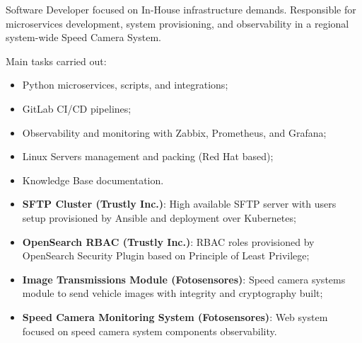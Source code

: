 \documentclass[10pt,a4paper]{altacv}
\begin{document}
\divider


Software Developer focused on In-House infrastructure demands. Responsible for microservices development, system provisioning, and observability in a regional system-wide Speed Camera System.

\bigskip

Main tasks carried out:

\bigskip

\begin{itemize}
    \item Python microservices, scripts, and integrations;
    \item GitLab CI/CD pipelines;
    \item Observability and monitoring with Zabbix, Prometheus, and Grafana;
    \item Linux Servers management and packing (Red Hat based);
    \item Knowledge Base documentation.
\end{itemize}


\begin{itemize}
    \item \textbf{SFTP Cluster (Trustly Inc.)}: High available SFTP server with users setup provisioned by Ansible and deployment over Kubernetes;
    \item \textbf{OpenSearch RBAC (Trustly Inc.)}: RBAC roles provisioned by OpenSearch Security Plugin based on Principle of Least Privilege;
    \item \textbf{Image Transmissions Module (Fotosensores)}: Speed camera systems module to send vehicle images with integrity and cryptography built;
    \item \textbf{Speed Camera Monitoring System (Fotosensores)}: Web system focused on speed camera system components observability.
\end{itemize}




\clearpage
\end{document}
